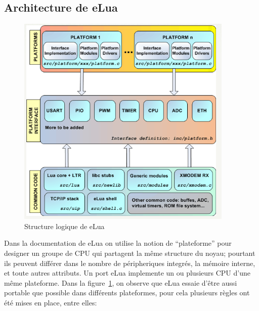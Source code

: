 \subsection{Architecture de eLua}

\begin{figure}[h]
\begin{center}
\includegraphics[scale=0.6]{figure/eLua/schema.png}
\caption{Structure logique de eLua}
\label{elua}
\end{center}
\end{figure}

  Dans la documentation de eLua on utilise la notion de ``plateforme'' pour designer un groupe de CPU qui partagent la même structure du noyau; pourtant
ils peuvent différer dans le nombre de péripheriques integrés, la mémoire interne, et toute autres attributs. Un port eLua implemente un ou plusieurs
CPU d'une même plateforme.
Dans la figure~\ref{elua}, on observe que eLua essaie d'être aussi portable que possible dans différents plateformes, pour cela plusieurs règles ont été mises en
place, entre elles:

